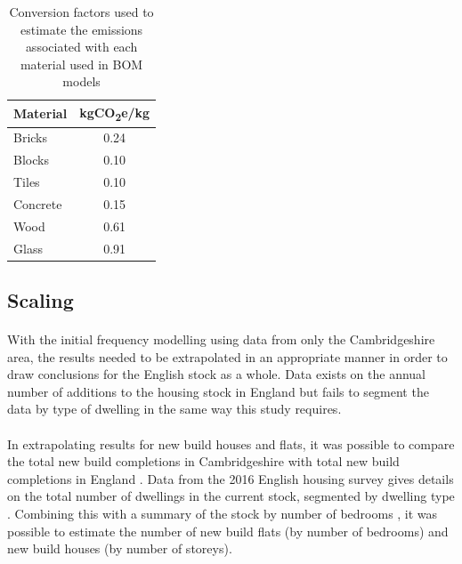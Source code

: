 \documentclass[12pt]{article}
\begin{document}
\begingroup
\linespread{1}
\begin{table}[htbp]
  \centering
  \caption{Conversion factors used to estimate the emissions associated with each material used in BOM models}
    \begin{tabular}{lc}
    \toprule
    \textbf{Material} & \textbf{kgCO\textsubscript{2}e/kg} \\
    \midrule
    Bricks & 0.24 \\
    Blocks & 0.10 \\
    Tiles & 0.10 \\
    Concrete & 0.15 \\
    Wood  & 0.61 \\
    Glass & 0.91 \\
    \bottomrule
    \end{tabular}%
  \label{tab:emissionsfactors}%
\end{table}%
\endgroup

\subsection{Scaling}
\label{scaling}

\paragraph{}
With the initial frequency modelling using data from only the Cambridgeshire area, the results needed to be extrapolated in an appropriate manner in order to draw conclusions for the English stock as a whole. Data exists on the annual number of additions to the housing stock in England but fails to segment the data by type of dwelling in the same way this study requires.

\paragraph{}
In extrapolating results for new build houses and flats, it was possible to compare the total new build completions in Cambridgeshire with total new build completions in England \citep{Ministry_of_Housing_Communities2012-rt}. Data from the 2016 English housing survey gives details on the total number of dwellings in the current stock, segmented by dwelling type \citep{Ministry_of_Housing_Communities_and_Local_Government2017-xx}. Combining this with a summary of the stock by number of bedrooms \citep{Ministry_of_Housing_Communities2012-ez}, it was possible to estimate the number of new build flats (by number of bedrooms) and new build houses (by number of storeys).
\end{document}
